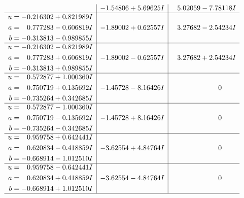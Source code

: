 \documentclass[1p]{elsarticle_modified}
\theoremstyle{definition}
\begin{document}
$$\begin{array}{c|c|c}
 & -1.54806 + 5.69625 I & \phantom{-}5.02059 - 7.78118 I \\ \hline\begin{aligned}
u &= -0.216302 + 0.821989 I \\
a &= \phantom{-}0.777283 - 0.606819 I \\
b &= -0.313813 - 0.989855 I\end{aligned}
 & -1.89002 + 0.62557 I & \phantom{-}3.27682 - 2.54234 I \\ \hline\begin{aligned}
u &= -0.216302 - 0.821989 I \\
a &= \phantom{-}0.777283 + 0.606819 I \\
b &= -0.313813 + 0.989855 I\end{aligned}
 & -1.89002 - 0.62557 I & \phantom{-}3.27682 + 2.54234 I \\ \hline\begin{aligned}
u &= \phantom{-}0.572877 + 1.000360 I \\
a &= \phantom{-}0.750719 + 0.135692 I \\
b &= -0.735264 + 0.342685 I\end{aligned}
 & -1.45728 - 8.16426 I & \phantom{-0.000000 } 0 \\ \hline\begin{aligned}
u &= \phantom{-}0.572877 - 1.000360 I \\
a &= \phantom{-}0.750719 - 0.135692 I \\
b &= -0.735264 - 0.342685 I\end{aligned}
 & -1.45728 + 8.16426 I & \phantom{-0.000000 } 0 \\ \hline\begin{aligned}
u &= \phantom{-}0.959758 + 0.642441 I \\
a &= \phantom{-}0.620834 - 0.418859 I \\
b &= -0.668914 - 1.012510 I\end{aligned}
 & -3.62554 + 4.84764 I & \phantom{-0.000000 } 0 \\ \hline\begin{aligned}
u &= \phantom{-}0.959758 - 0.642441 I \\
a &= \phantom{-}0.620834 + 0.418859 I \\
b &= -0.668914 + 1.012510 I\end{aligned}
 & -3.62554 - 4.84764 I & \phantom{-0.000000 } 0\\
 \hline 
 \end{array}$$\newpage$$\begin{array}{c|c|c}  

\end{array}$$
\end{document}
